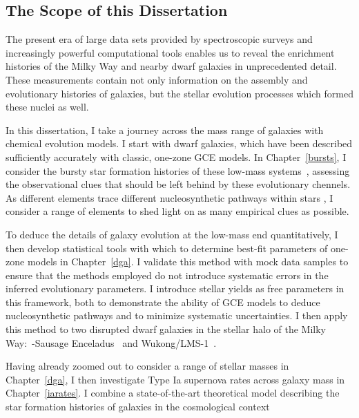 \documentclass[main.tex]{subfiles}
\begin{document}
\begin{doublespace}
\section{The Scope of this Dissertation}
\label{main:sec:intro:scope}

The present era of large data sets provided by spectroscopic surveys and
increasingly powerful computational tools enables us to reveal the enrichment
histories of the Milky Way and nearby dwarf galaxies in unprecedented detail.
These measurements contain not only information on the assembly and evolutionary
histories of galaxies, but the stellar evolution processes which formed these
nuclei as well.
\par
In this dissertation, I take a journey across the mass range of galaxies with
chemical evolution models.
I start with dwarf galaxies, which have been described sufficiently accurately
with classic, one-zone GCE models.
In Chapter~\ref{bursts}, I consider the bursty star formation histories
of these low-mass systems~\citep[e.g.,][]{Weisz2014a}, assessing the
observational clues that should be left behind by these evolutionary chennels.
As different elements trace different nucleosynthetic pathways within stars
\citep[e.g.,][]{Johnson2019}, I consider a range of elements to shed light
on as many empirical clues as possible.
\par
To deduce the details of galaxy evolution at the low-mass end quantitatively, I
then develop statistical tools with which to determine best-fit
parameters of one-zone models in Chapter~\ref{dga}.
I validate this method with mock data samples to ensure that the methods
employed do not introduce systematic errors in the inferred evolutionary
parameters.
I introduce stellar yields as free parameters in this framework, both to
demonstrate the ability of GCE models to deduce nucleosynthetic pathways and
to minimize systematic uncertainties.
I then apply this method to two disrupted dwarf galaxies in the stellar halo
of the Milky Way:~\gaia-Sausage Enceladus~\citep{Helmi2018,
Belokurov2018} and Wukong/LMS-1~\citep{Naidu2020, Naidu2022, Yuan2020}.
\par
Having already zoomed out to consider a range of stellar masses in
Chapter~\ref{dga}, I then investigate Type Ia supernova rates across
galaxy mass in Chapter~\ref{iarates}.
I combine a state-of-the-art theoretical model describing the star
formation histories of galaxies in the cosmological context

\end{doublespace}
\end{document}
